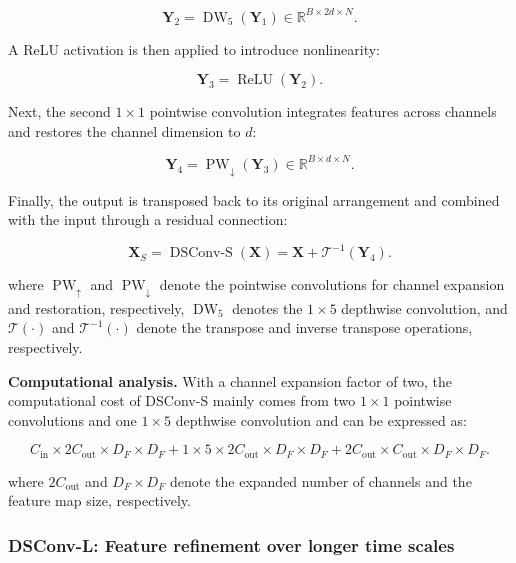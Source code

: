 \begin{equation}
\mathbf Y_2
=
\operatorname{DW}_{5}(\mathbf Y_1)
\in\mathbb R^{B\times 2d\times N}.
\end{equation}

A ReLU activation is then applied to introduce nonlinearity:

\begin{equation}
\mathbf Y_3
=
\operatorname{ReLU}(\mathbf Y_2).
\end{equation}

Next, the second $1\times1$ pointwise convolution integrates features across channels and restores the channel dimension to $d$:

\begin{equation}
\mathbf Y_4
=
\operatorname{PW}_{\downarrow}(\mathbf Y_3)
\in\mathbb R^{B\times d\times N}.
\end{equation}

Finally, the output is transposed back to its original arrangement and combined with the input through a residual connection:

\begin{equation}
\mathbf X_S
=
\operatorname{DSConv\text{-}S}(\mathbf X)
=
\mathbf X+\mathcal T^{-1}(\mathbf Y_4).
\label{eq:dsconv_s}
\end{equation}

where $\operatorname{PW}_{\uparrow}$ and $\operatorname{PW}_{\downarrow}$ denote the pointwise convolutions for channel expansion and restoration, respectively, $\operatorname{DW}_{5}$ denotes the $1\times5$ depthwise convolution, and $\mathcal T(\cdot)$ and $\mathcal T^{-1}(\cdot)$ denote the transpose and inverse transpose operations, respectively.

\textbf{Computational analysis.} With a channel expansion factor of two, the computational cost of DSConv-S mainly comes from two $1\times1$ pointwise convolutions and one $1\times5$ depthwise convolution and can be expressed as:

\begin{equation}
C_{\mathrm{in}}\times2C_{\mathrm{out}}\times D_F\times D_F
+1\times5\times2C_{\mathrm{out}}\times D_F\times D_F
+2C_{\mathrm{out}}\times C_{\mathrm{out}}\times D_F\times D_F.
\label{eq:dsconv_s_expanded_cost}
\end{equation}

where $2C_{\mathrm{out}}$ and $D_F\times D_F$ denote the expanded number of channels and the feature map size, respectively.

\subsubsection{DSConv-L: Feature refinement over longer time scales}

